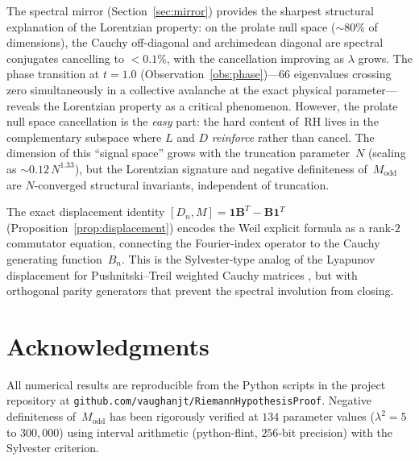 \documentclass[11pt,a4paper]{article}
\begin{document}
The spectral mirror (Section~\ref{sec:mirror}) provides the sharpest structural explanation of the Lorentzian property: on the prolate null space ($\sim 80\%$ of dimensions), the Cauchy off-diagonal and archimedean diagonal are spectral conjugates cancelling to $< 0.1\%$, with the cancellation improving as $\lambda$ grows. The phase transition at $t = 1.0$ (Observation~\ref{obs:phase})---66 eigenvalues crossing zero simultaneously in a collective avalanche at the exact physical parameter---reveals the Lorentzian property as a critical phenomenon. However, the prolate null space cancellation is the \emph{easy} part: the hard content of~RH lives in the complementary subspace where $L$ and $D$ \emph{reinforce} rather than cancel. The dimension of this ``signal space'' grows with the truncation parameter~$N$ (scaling as $\sim 0.12 \, N^{1.33}$), but the Lorentzian signature and negative definiteness of~$M_{\mathrm{odd}}$ are $N$-converged structural invariants, independent of truncation.

The exact displacement identity $[D_n, M] = \mathbf{1}\mathbf{B}^T - \mathbf{B}\mathbf{1}^T$ (Proposition~\ref{prop:displacement}) encodes the Weil explicit formula as a rank-$2$ commutator equation, connecting the Fourier-index operator to the Cauchy generating function~$B_n$. This is the Sylvester-type analog of the Lyapunov displacement for Pushnitski--Treil weighted Cauchy matrices \cite{PT2025}, but with orthogonal parity generators that prevent the spectral involution from closing.


\section*{Acknowledgments}

All numerical results are reproducible from the Python scripts in the project repository at \texttt{github.com/vaughanjt/RiemannHypothesisProof}. Negative definiteness of~$M_{\mathrm{odd}}$ has been rigorously verified at $134$ parameter values ($\lambda^2 = 5$ to $300{,}000$) using interval arithmetic (python-flint, $256$-bit precision) with the Sylvester criterion.
\end{document}
